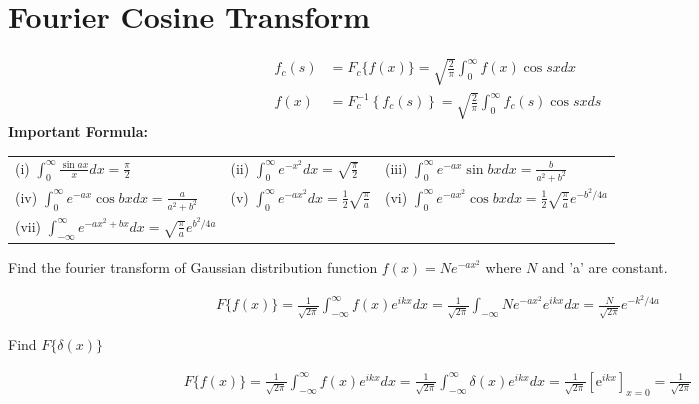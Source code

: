 \section{Fourier Cosine Transform}
\begin{align*}
f_{c}(s)&=F_{c}\{f(x)\}=\sqrt{\frac{2}{\pi}} \int_{0}^{\infty} f(x) \cos s x d x \\
f(x)&=F_{c}^{-1}\left\{f_{c}(s)\right\}=\sqrt{\frac{2}{\pi}} \int_{0}^{\infty} f_{c}(s) \cos s x d s
\end{align*}
\textbf{Important Formula:}\\
\renewcommand*{\arraystretch}{2}
\begin{tabular}{p{5cm}p{5cm}p{6cm}}
	(i) $\int_{0}^{\infty} \frac{\sin a x}{x} d x=\frac{\pi}{2}$&
	(ii) $\int_{0}^{\infty} e^{-x^{2}} d x=\sqrt{\frac{\pi}{2}}$&
	(iii) $\int_{0}^{\infty} e^{-a x} \sin b x d x=\frac{b}{a^{2}+b^{2}}$\\
	(iv) $\int_{0}^{\infty} e^{-a x} \cos b x d x=\frac{a}{a^{2}+b^{2}}$&
	(v) $\int_{0}^{\infty} e^{-a x^{2}} d x=\frac{1}{2} \sqrt{\frac{\pi}{a}}$&
	(vi) $\int_{0}^{\infty} e^{-a x^{2}} \cos b x d x=\frac{1}{2} \sqrt{\frac{\pi}{a}} e^{-b^{2} / 4 a}$\\
	(vii)
	$\int_{-\infty}^{\infty} e^{-a x^{2}+b x} d x=\sqrt{\frac{\pi}{a}} e^{b^{2} / 4 a}$& & 
\end{tabular}
\begin{exercise}
	Find the fourier transform of Gaussian distribution function $f(x)=N e^{-a x^{2}}$ where $N$ and 'a' are constant.
\end{exercise}
\begin{answer}
	\begin{align*}
	F\{f(x)\}=\frac{1}{\sqrt{2 \pi}} \int_{-\infty}^{\infty} f(x) e^{i k x} d x=\frac{1}{\sqrt{2 \pi}} \int_{-\infty} N e^{-a x^{2}} e^{i k x} d x=\frac{N}{\sqrt{2 \pi}} e^{-k^{2} / 4 a}
	\end{align*}
\end{answer}
\begin{exercise}
	Find $F\{\delta(x)\}$
\end{exercise}
\begin{answer}
	\begin{align*}
	F\{f(x)\}=\frac{1}{\sqrt{2 \pi}} \int_{-\infty}^{\infty} f(x) e^{i k x} d x=\frac{1}{\sqrt{2 \pi}} \int_{-\infty}^{\infty} \delta(x) e^{i k x} d x=\frac{1}{\sqrt{2 \pi}}\left[\mathrm{e}^{i k x}\right]_{x=0}=\frac{1}{\sqrt{2 \pi}}
	\end{align*}
\end{answer}

